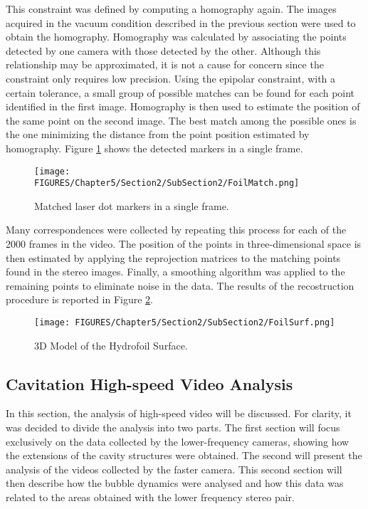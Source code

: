 This constraint was defined by computing a homography again. The images acquired in the vacuum condition described in the previous section were used to obtain the homography. Homography was calculated by associating the points detected by one camera with those detected by the other. 
Although this relationship may be approximated, it is not a cause for concern since the constraint only requires low precision.
Using the epipolar constraint, with a certain tolerance, a small group of possible matches can be found for each point identified in the first image. 
Homography is then used to estimate the position of the same point on the second image.
The best match among the possible ones is the one minimizing the distance from the point position estimated by homography. Figure \ref{fig:FoilMatch} shows the detected markers in a single frame.

\begin{figure}[htbp]
    \centering
    \texttt{[image: FIGURES/Chapter5/Section2/SubSection2/FoilMatch.png]}
    \caption{Matched laser dot markers in a single frame.}
    \label{fig:FoilMatch}
\end{figure}

Many correspondences were collected by repeating this process for each of the 2000 frames in the video.
The position of the points in three-dimensional space is then estimated by applying the reprojection matrices to the matching points found in the stereo images. Finally, a smoothing algorithm was applied to the remaining points to eliminate noise in the data. 
The results of the recostruction procedure is reported in Figure \ref{fig:FoilSurf}.

\begin{figure}[htbp]
    \centering
    \texttt{[image: FIGURES/Chapter5/Section2/SubSection2/FoilSurf.png]}
    \caption{3D Model of the Hydrofoil Surface.}
    \label{fig:FoilSurf}
\end{figure}

\subsection{Cavitation High-speed Video Analysis}
\label{sez:video}
In this section, the analysis of high-speed video will be discussed. For clarity, it was decided to divide the analysis into two parts.
The first section will focus exclusively on the data collected by the lower-frequency cameras, showing how the extensions of the cavity structures were obtained. The second will present the analysis of the videos collected by the faster camera. This second section will then describe how the bubble dynamics were analysed and how this data was related to the areas obtained with the lower frequency stereo pair.

